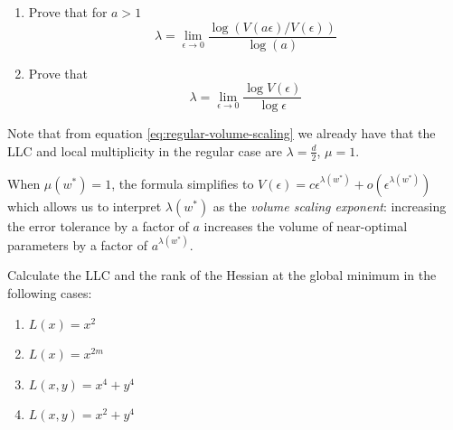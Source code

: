 \documentclass[11pt]{article}
\begin{document}
\begin{exercise} \label{ex:solving-for-lambda}
\begin{enumerate}
    \item Prove that for $a>1$
    \begin{equation} \label{eq:llc-formula}
    \lambda = \lim_{\epsilon \to 0} \frac{\log(V(a\epsilon)/V(\epsilon))}{\log(a)}
    \end{equation}
    
    \item Prove that \begin{equation} \label{eq:solve-LLC}
    \lambda = \lim\limits_{\epsilon\to 0} \frac{\log V(\epsilon)}{\log \epsilon} \end{equation}
\end{enumerate}
\end{exercise}

Note that from equation \eqref{eq:regular-volume-scaling} we already have that the LLC and local multiplicity in the regular case are $\lambda = \frac{d}{2}$, $\mu=1$.

When $\mu(w^*) = 1$, the formula simplifies to $V(\epsilon) = c\epsilon^{\lambda(w^*)} + o(\epsilon^{\lambda(w^*)})$ which allows us to interpret $\lambda(w^*)$ as the \textit{volume scaling exponent}: increasing the error tolerance by a factor of $a$ increases the volume of near-optimal parameters by a factor of $a^{\lambda(w^*)}$.

\begin{exercise}
\label{ex:calculating-llc}
    Calculate the LLC and the rank of the Hessian at the global minimum in the following cases:
    \begin{enumerate}
        \item $L(x)=x^2$
        \item $L(x) = x^{2m}$
        \item $L(x,y) = x^4 + y^4$ 
        \item \label{ex:calculating-LLC-d} $L(x,y) = x^2+y^4$
    \end{enumerate}
\end{exercise}
\end{document}

